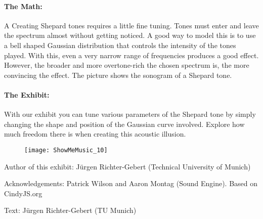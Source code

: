 \paragraph{The Math:} A Creating Shepard tones requires a little fine tuning. Tones must enter and leave the spectrum almost without getting noticed. A good way to model this is to use a bell shaped Gaussian distribution that controls the intensity of the tones played. With this, even a very narrow range of frequencies produces a good effect. However, the broader and more overtone-rich the chosen spectrum is, the more convincing the effect. The picture shows the sonogram of a Shepard tone.

\paragraph{The Exhibit:} With our exhibit you can tune various parameters of the Shepard tone by simply changing the shape and position of the Gaussian curve involved. Explore how much freedom there is when creating this acoustic illusion.

\begin{figure}[h]
\centering
\texttt{[image: ShowMeMusic\_10]}
\end{figure}
\strut
\vspace{6em}

\begin{sectcredits}
\item[Author of this exhibit:] Jürgen Richter-Gebert (Technical University of Munich)
\item[Acknowledgements:] Patrick Wilson and Aaron Montag (Sound Engine). Based on CindyJS.org
\item[Text:] Jürgen Richter-Gebert (TU Munich)
\end{sectcredits}
